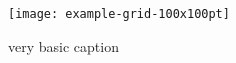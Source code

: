 \begin{figure}[H]
	\centering
	\texttt{[image: example-grid-100x100pt]}
	\caption{very basic caption}
	\label{fig:sample_figure}
\end{figure}
